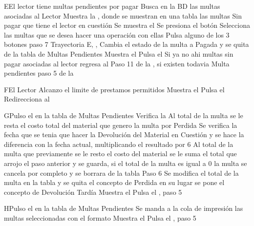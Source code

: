 		\begin{UCtrayectoriaA}{E}{El lector tiene multas pendientes por pagar}
			\UCpaso[\UCsist] Busca en la BD las multas asociadas al Lector
			\UCpaso[\UCsist] Muestra la , donde se muestran en una tabla las multas Sin pagar que tiene el lector en cuestión
			\UCpaso[\UCsist] Se muestra el 
			\UCpaso[\UCactor] Se presiona el botón 
			\UCpaso[\UCactor] Selecciona las multas que se desea hacer una operación con ellas
			\UCpaso[\UCactor] Pulsa alguno de los 3 botones  paso 7 Trayectoria E,  ,  
			\UCpaso[\UCsist] Cambia el estado de la multa a Pagada y se quita de la tabla de Multas Pendientes
			\UCpaso[\UCsist] Muestra el 
			\UCpaso[\UCactor] Pulsa el 
			\UCpaso[\UCsist] Si ya no ahi multas sin pagar asociadas al lector regresa al Paso 11 de la , si existen todavia Multa pendientes paso 5 de la 
		\end{UCtrayectoriaA}
		\begin{UCtrayectoriaA}{F}{El Lector Alcanzo el limite de prestamos permitidos}
			\UCpaso[\UCsist] Muestra el 
			\UCpaso[\UCactor] Pulsa el 
			\UCpaso[\UCsist] Redirecciona al 
		\end{UCtrayectoriaA}
		\begin{UCtrayectoriaA}{G}{Pulso el  en la tabla de Multas Pendientes}
			\UCpaso[\UCsist] Verifica la 
			\UCpaso[\UCsist] Al total de la multa se le resta el costo total del material que genero la multa por Perdida
			\UCpaso[\UCsist] Se verifica la fecha que se tenia que hacer la Devolución del Material en Cuestión y se hace la diferencia con la fecha actual, multiplicando el resultado por 6
			\UCpaso[\UCsist] Al total de la multa que previamente se le resto el costo del material se le suma el total que arrojo el paso anterior y se guarda, si el total de la multa es igual a 0 la multa se cancela por completo y se borrara de la tabla Paso 6 
			\UCpaso[\UCsist] Se modifica el total de la multa en la tabla y se quita el concepto de Perdida en su lugar se pone el concepto de Devolución Tardía
			\UCpaso[\UCsist] Muestra el 
			\UCpaso[\UCactor] Pulsa el , paso 5 
		\end{UCtrayectoriaA}
		\begin{UCtrayectoriaA}{H}{Pulso el  en la tabla de Multas Pendientes}
			\UCpaso[\UCsist] Se manda a la cola de impresión las multas seleccionadas con el formato 
			\UCpaso[\UCsist] Muestra el 
			\UCpaso[\UCactor] Pulsa el , paso 5 
		\end{UCtrayectoriaA}
		
